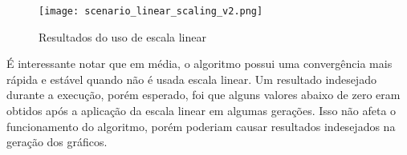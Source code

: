 \documentclass[conference]{IEEEtran}
\begin{document}
\begin{figure}[h!]
	\centering
	\texttt{[image: scenario\_linear\_scaling\_v2.png]}
	\caption{Resultados do uso de escala linear}
	\label{fig:scenario_linear_scaling}
\end{figure}

É interessante notar que em média, o algoritmo possui uma convergência mais rápida e estável quando não é usada escala linear. Um resultado indesejado durante a execução, porém esperado, foi que alguns valores abaixo de zero eram obtidos após a aplicação da escala linear em algumas gerações. Isso não afeta o funcionamento do algoritmo, porém poderiam causar resultados indesejados na geração dos gráficos. 



%
%

\end{document}
